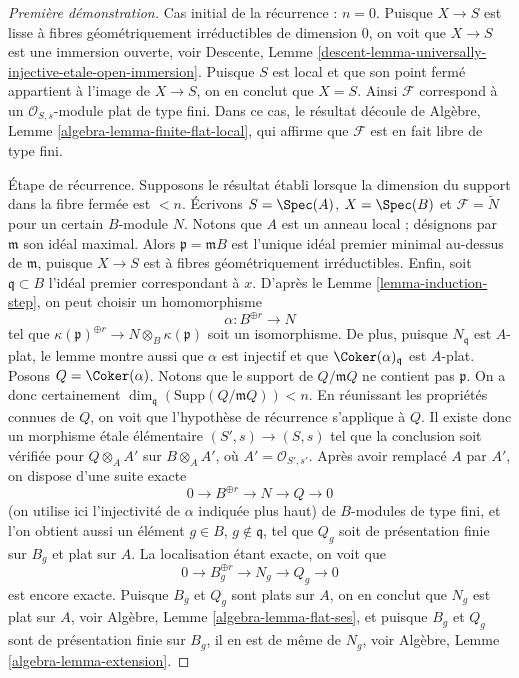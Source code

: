 \begin{proof}[Première démonstration]
\medskip\noindent
Cas initial de la récurrence : $n = 0$.
Puisque $X \to S$ est lisse à fibres géométriquement
irréductibles de dimension $0$, on voit que $X \to S$ est une immersion
ouverte, voir
Descente, Lemme \ref{descent-lemma-universally-injective-etale-open-immersion}.
Puisque $S$ est local et que son point fermé appartient à l'image de $X \to S$,
on en conclut que $X = S$. Ainsi $\mathcal{F}$ correspond
à un $\mathcal{O}_{S, s}$-module plat de type fini. Dans ce cas, le résultat
découle de
Algèbre, Lemme \ref{algebra-lemma-finite-flat-local},
qui affirme que $\mathcal{F}$ est en fait libre de type fini.

\medskip\noindent
Étape de récurrence. Supposons le résultat établi lorsque la dimension
du support dans la fibre fermée est $< n$. Écrivons $S = \Spec(A)$,
$X = \Spec(B)$ et $\mathcal{F} = \widetilde{N}$ pour un certain $B$-module
$N$. Notons que $A$ est un anneau local ; désignons par $\mathfrak m$ son idéal maximal.
Alors $\mathfrak p = \mathfrak mB$ est l'unique idéal premier minimal au-dessus de
$\mathfrak m$, puisque $X \to S$ est à fibres géométriquement irréductibles. Enfin,
soit $\mathfrak q \subset B$ l'idéal premier correspondant à $x$. D'après le
Lemme \ref{lemma-induction-step},
on peut choisir un homomorphisme
$$
\alpha : B^{\oplus r} \to N
$$
tel que $\kappa(\mathfrak p)^{\oplus r} \to N \otimes_B \kappa(\mathfrak p)$
soit un isomorphisme. De plus, puisque $N_{\mathfrak q}$ est $A$-plat, le lemme
montre aussi que $\alpha$ est injectif et que
$\Coker(\alpha)_{\mathfrak q}$ est $A$-plat.
Posons $Q = \Coker(\alpha)$. Notons que le support de $Q/\mathfrak mQ$
ne contient pas $\mathfrak p$. On a donc certainement
$\dim_{\mathfrak q}(\text{Supp}(Q/\mathfrak mQ)) < n$.
En réunissant les propriétés connues de $Q$, on voit
que l'hypothèse de récurrence s'applique à $Q$. Il existe donc
un morphisme \'etale élémentaire $(S', s) \to (S, s)$ tel que la conclusion
soit vérifiée pour $Q \otimes_A A'$ sur $B \otimes_A A'$, où
$A' = \mathcal{O}_{S', s'}$. Après avoir remplacé $A$ par $A'$, on dispose d'une
suite exacte
$$
0 \to B^{\oplus r} \to N \to Q \to 0
$$
(on utilise ici l'injectivité de $\alpha$ indiquée plus haut)
de $B$-modules de type fini, et l'on obtient aussi un élément
$g \in B$, $g \not \in \mathfrak q$, tel que
$Q_g$ soit de présentation finie sur $B_g$ et plat sur $A$. La localisation
étant exacte, on voit que
$$
0 \to B_g^{\oplus r} \to N_g \to Q_g \to 0
$$
est encore exacte. Puisque $B_g$ et $Q_g$ sont plats sur $A$, on en conclut que
$N_g$ est plat sur $A$, voir
Algèbre, Lemme \ref{algebra-lemma-flat-ses},
et puisque $B_g$ et $Q_g$ sont de présentation finie sur $B_g$, il en est de même
de $N_g$, voir
Algèbre, Lemme \ref{algebra-lemma-extension}.
\end{proof}

